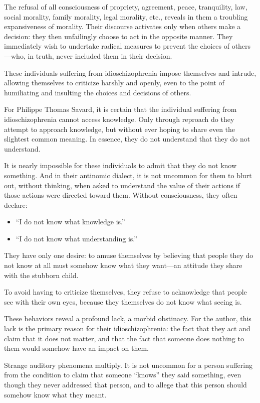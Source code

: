 \documentclass[12pt,oneside]{article}
\begin{document}
The refusal of all consciousness of propriety, agreement, peace, tranquility, law, social morality, family morality, legal morality, etc., reveals in them a troubling expansiveness of morality. Their discourse activates only when others make a decision: they then unfailingly choose to act in the opposite manner. They immediately wish to undertake radical measures to prevent the choices of others—who, in truth, never included them in their decision.

These individuals suffering from idioschizophrenia impose themselves and intrude, allowing themselves to criticize harshly and openly, even to the point of humiliating and insulting the choices and decisions of others.

For Philippe Thomas Savard, it is certain that the individual suffering from idioschizophrenia cannot access knowledge. Only through reproach do they attempt to approach knowledge, but without ever hoping to share even the slightest common meaning. In essence, they do not understand that they do not understand.

It is nearly impossible for these individuals to admit that they do not know something. And in their antinomic dialect, it is not uncommon for them to blurt out, without thinking, when asked to understand the value of their actions if those actions were directed toward them. Without consciousness, they often declare:

\begin{itemize}
    \item “I do not know what knowledge is.”
    \item “I do not know what understanding is.”
\end{itemize}

They have only one desire: to amuse themselves by believing that people they do not know at all must somehow know what they want—an attitude they share with the stubborn child.

To avoid having to criticize themselves, they refuse to acknowledge that people see with their own eyes, because they themselves do not know what seeing is.

These behaviors reveal a profound lack, a morbid obstinacy. For the author, this lack is the primary reason for their idioschizophrenia: the fact that they act and claim that it does not matter, and that the fact that someone does nothing to them would somehow have an impact on them.

Strange auditory phenomena multiply. It is not uncommon for a person suffering from the condition to claim that someone “knows” they said something, even though they never addressed that person, and to allege that this person should somehow know what they meant.
\end{document}
